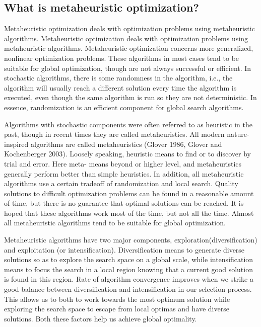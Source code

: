 \documentclass[a4paper]{article}
\begin{document}
\subsection{What is metaheuristic optimization?}
\par Metaheuristic optimization 
deals with optimization problems using metaheuristic algorithms.
Metaheuristic optimization deals with optimization problems using metaheuristic algorithms. Metaheuristic optimization concerns more generalized, nonlinear optimization problems. These algorithms in most cases tend to be suitable for global
optimization, though are not always successful or efficient.
In stochastic algorithms, there is some randomness in the algorithm, i.e., the algorithm will usually reach a different solution every time the algorithm is executed, even though the same algorithm is run so they are not deterministic. In essence, randomization is an efficient component for global search algorithms.
\par Algorithms with stochastic components were often referred to as heuristic in the past, though in recent times they are called metaheuristics. All modern nature-inspired algorithms are called metaheuristics (Glover 1986, Glover and Kochenberger 2003). Loosely speaking, heuristic means to find or to discover by trial and error. Here meta- means beyond or higher level, and metaheuristics generally perform better than simple heuristics. In addition, all metaheuristic algorithms use a certain tradeoff of randomization and local search. Quality solutions to difficult optimization problems can be found in a reasonable amount of time, but there is no guarantee that optimal solutions can be reached. 
It is hoped that these algorithms work most of the time, but not all the time. Almost all metaheuristic algorithms tend to be suitable for global optimization.
\par Metaheuristic algorithms have two major components, exploration(diversification) and exploitation (or intensification). Diversification means to generate diverse
 solutions so as to explore the search space on a global scale, while intensification means to focus the search in a local region knowing that a current good solution
  is found in this region. Rate of algorithm convergence improves when we strike a good balance between diversification and intensification in our selection process. This allows us to both to work towards the most optimum solution while exploring the search space to escape from local optimas and have diverse solutions. Both these factors help us achieve global optimality.
\end{document}
